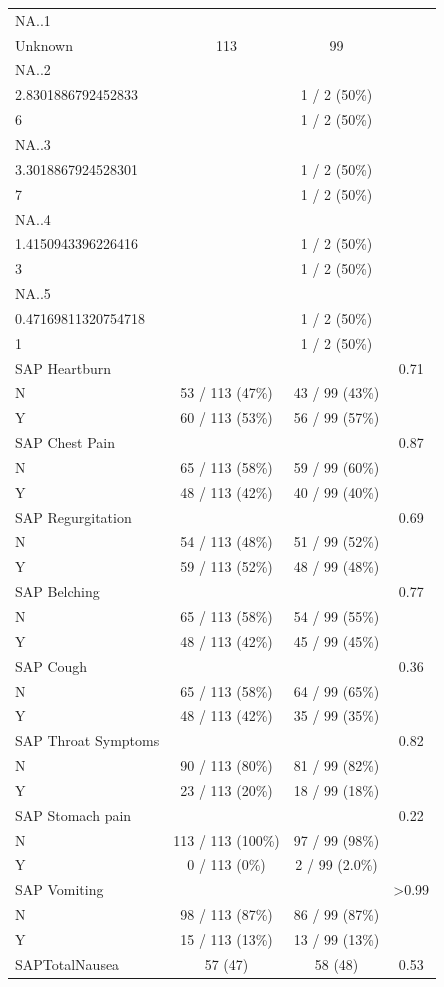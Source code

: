 \documentclass[english,man,floatsintext]{apa6}
\begin{document}
\begin{longtable}{lccc}
NA..1 &  &  &  \\ 
Unknown & 113 & 99 &  \\ 
NA..2 &  &  &  \\ 
2.8301886792452833 &  & 1 / 2 (50\%) &  \\ 
6 &  & 1 / 2 (50\%) &  \\ 
NA..3 &  &  &  \\ 
3.3018867924528301 &  & 1 / 2 (50\%) &  \\ 
7 &  & 1 / 2 (50\%) &  \\ 
NA..4 &  &  &  \\ 
1.4150943396226416 &  & 1 / 2 (50\%) &  \\ 
3 &  & 1 / 2 (50\%) &  \\ 
NA..5 &  &  &  \\ 
0.47169811320754718 &  & 1 / 2 (50\%) &  \\ 
1 &  & 1 / 2 (50\%) &  \\ 
SAP Heartburn &  &  & 0.71 \\ 
N & 53 / 113 (47\%) & 43 / 99 (43\%) &  \\ 
Y & 60 / 113 (53\%) & 56 / 99 (57\%) &  \\ 
SAP Chest Pain &  &  & 0.87 \\ 
N & 65 / 113 (58\%) & 59 / 99 (60\%) &  \\ 
Y & 48 / 113 (42\%) & 40 / 99 (40\%) &  \\ 
SAP Regurgitation &  &  & 0.69 \\ 
N & 54 / 113 (48\%) & 51 / 99 (52\%) &  \\ 
Y & 59 / 113 (52\%) & 48 / 99 (48\%) &  \\ 
SAP Belching &  &  & 0.77 \\ 
N & 65 / 113 (58\%) & 54 / 99 (55\%) &  \\ 
Y & 48 / 113 (42\%) & 45 / 99 (45\%) &  \\ 
SAP Cough &  &  & 0.36 \\ 
N & 65 / 113 (58\%) & 64 / 99 (65\%) &  \\ 
Y & 48 / 113 (42\%) & 35 / 99 (35\%) &  \\ 
SAP Throat Symptoms &  &  & 0.82 \\ 
N & 90 / 113 (80\%) & 81 / 99 (82\%) &  \\ 
Y & 23 / 113 (20\%) & 18 / 99 (18\%) &  \\ 
SAP Stomach pain &  &  & 0.22 \\ 
N & 113 / 113 (100\%) & 97 / 99 (98\%) &  \\ 
Y & 0 / 113 (0\%) & 2 / 99 (2.0\%) &  \\ 
SAP Vomiting &  &  & >0.99 \\ 
N & 98 / 113 (87\%) & 86 / 99 (87\%) &  \\ 
Y & 15 / 113 (13\%) & 13 / 99 (13\%) &  \\ 
SAPTotalNausea & 57 (47) & 58 (48) & 0.53 \\ 
\bottomrule
\end{longtable}
\end{document}
